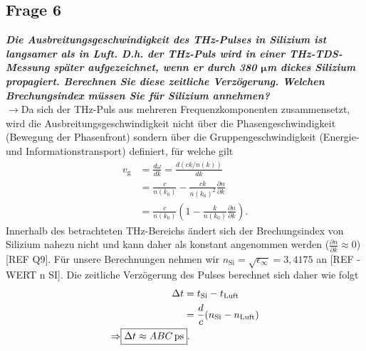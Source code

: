 \subsection{\label{subsec:FZV6}Frage 6}
\textbf{\textit{Die Ausbreitungsgeschwindigkeit des THz-Pulses in Silizium ist langsamer als in
Luft. D.h. der THz-Puls wird in einer THz-TDS-Messung später aufgezeichnet,
wenn er durch 380 $\mathbf{\mu}$m dickes Silizium propagiert. Berechnen Sie diese zeitliche
Verzögerung. Welchen Brechungsindex müssen Sie für Silizium annehmen?}}\\
$\rightarrow$Da sich der THz-Puls aus mehreren Frequenzkomponenten zusammensetzt, wird 
die Ausbreitungsgeschwindigkeit nicht über die Phasengeschwindigkeit (Bewegung der Phasenfront)
sondern über die Gruppengeschwindigkeit (Energie- und Informationstransport) definiert,
für welche gilt
\begin{align}
    v_{\text{g}} &= \frac{d\omega}{dk} = \frac{d(ck/n(k))}{dk} \\
    &= \frac{c}{n(k_{0})} - \frac{ck}{n(k_{0})^{2}}\frac{\partial n}{\partial k} \\
    &= \frac{c}{n(k_{0})}\left(1 - \frac{k}{n(k_{0})}\frac{\partial n}{\partial k}\right).
\end{align}
Innerhalb des betrachteten THz-Bereichs ändert sich der Brechungsindex von Silizium nahezu nicht und kann 
daher als konstant angenommen werden ($\frac{\partial n}{\partial k}\approx0$) [REF Q9].
Für unsere Berechnungen nehmen wir $n_{\text{Si}} = \sqrt{\epsilon_{\infty}} = 3,4175$ an [REF - WERT n SI].
Die zeitliche Verzögerung des Pulses berechnet sich daher wie folgt
\begin{align}
    \Delta t &= t_{\text{Si}} - t_{\text{Luft}} \\
    &= \frac{d}{c}(n_{\text{Si}}-n_{\text{Luft}}) \\
    \Rightarrow \Aboxed{\Delta t \approx ABC\,\si{ps}}.
\end{align}
